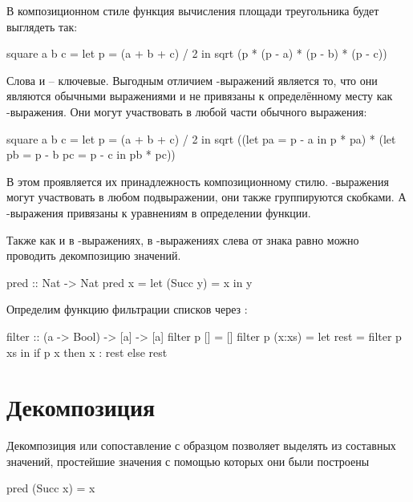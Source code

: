 В композиционном стиле функция вычисления площади треугольника будет
выглядеть так:

\begin{code}
square a b c = let p = (a + b + c) / 2
               in  sqrt (p * (p - a) * (p - b) * (p - c)) 
\end{code}

Слова   и  -- ключевые. Выгодным отличием
-выражений является то, что они являются обычными выражениями
и не привязаны к определённому месту как -выражения.
Они могут участвовать в любой части обычного выражения:

\begin{code}
square a b c = let p = (a + b + c) / 2
               in  sqrt ((let pa = p - a in p * pa) * 
                         (let pb = p - b
                              pc = p - c  
                          in  pb * pc)) 
\end{code}

В этом проявляется их принадлежность  композиционному
стилю. -выражения могут участвовать в любом 
подвыражении, они также группируются скобками. А -выражения
привязаны к уравнениям в определении функции.

Также как и в -выражениях, в -выражениях слева
от знака равно можно проводить декомпозицию значений.

\begin{code}
pred :: Nat -> Nat
pred x = let (Succ y) = x
         in  y
\end{code}

Определим функцию фильтрации списков через :

\begin{code}
filter :: (a -> Bool) -> [a] -> [a]
filter  p  []     = []
filter  p  (x:xs) = 
    let rest = filter p xs
    in  if p x then x : rest else rest
\end{code}


\section{Декомпозиция}

Декомпозиция или сопоставление с образцом позволяет
выделять из составных значений, простейшие значения
с помощью которых они были построены

\begin{code}
pred (Succ x) = x
\end{code}

